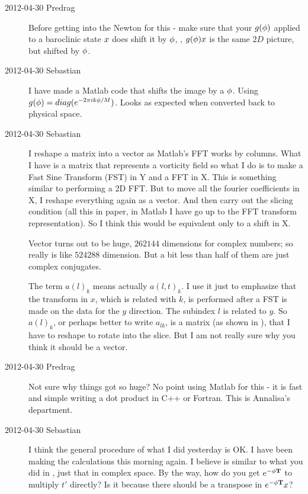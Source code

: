 \begin{description}
\item[2012-04-30 Predrag] Before getting into the Newton for this - make
sure that your $g({\bf \phi})$ applied to a baroclinic state $x$
does shift it by ${\bf \phi}$, \ie,  $g({\bf \phi})x$ is the same $2D$
picture, but shifted by ${\bf \phi}$.

\item[2012-04-30 Sebastian]
I have made a Matlab code that shifts the image by a ${\bf \phi}$. Using
$g({\bf \phi})=diag(e^{-2 \pi i k {\bf \phi} /M})$. Looks as expected when converted
back to physical space.

\item[2012-04-30 Sebastian]
I reshape a matrix into a vector as Matlab's FFT works by columns. What I
have is a matrix that represents a vorticity field  so what I do is to make a Fast Sine
Transform (FST) in Y and a FFT in X. This is something similar to
performing a 2D FFT. But to move all the fourier coefficients in X, I
reshape everything again as a vector. And then carry out the slicing
condition (all this in paper, in Matlab I have go up to the FFT transform
representation). So I think this would be equivalent only to a shift in
X.

Vector turns out to be huge, $262144$ dimensions for complex numbers; so
really is like $524288$ dimension. But a bit less than half of them are
just complex conjugates.

The term $a(l)_{k}$ means actually $a(l, t)_{k}$. I use it just to
emphasize that the transform in $x$, which is related with $k$, is
performed after a FST is made on the data for the $y$ direction. The
subindex $l$ is related to $y$. So $a(l)_{k}$, or perhaps better to write
$a_{lk}$, is a matrix (as shown in ), that I have
to reshape to rotate into the slice.  But I am not really sure why you
think it should be a vector.

\item[2012-04-30 Predrag]
Not sure why things got so huge? No point using Matlab for this - it is
fast and simple writing a dot product in C++ or Fortran. This is
Annalisa's department.

\item[2012-04-30 Sebastian]
I think the general procedure of what I did yesterday is OK. I have been
making the calculations this morning again. I believe is similar to what
you did in , just that in complex space. By the way,
how do you get $e^{-{\bf \phi} \mathbf{T}}$ to multiply $t'$ directly? Is it
because there should be a transpose in $e^{-{\bf \phi} \mathbf{T}} x$?


\end{description}
